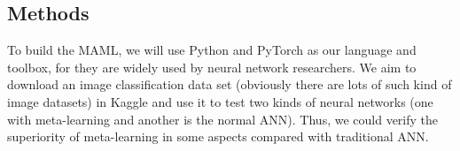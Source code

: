 \documentclass[../proposal.tex]{subfiles}
\begin{document}
\subsection{Methods}
To build the MAML, we will use Python and PyTorch as our language and toolbox,
for they are widely used by neural network researchers. We aim to download an
image classification data set (obviously there are lots of such kind of image
datasets) in Kaggle and use it to test two kinds of neural networks (one with
meta-learning and another is the normal ANN). Thus, we could verify the
superiority of meta-learning in some aspects compared with traditional ANN.
\end{document}
